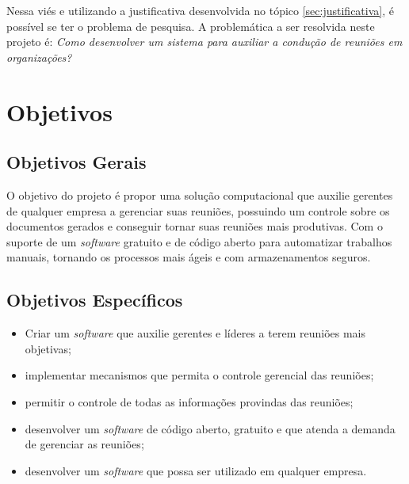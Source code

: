 Nessa viés e utilizando a justificativa desenvolvida no tópico \ref{sec:justificativa}, é possível se ter o problema de pesquisa. A problemática a ser resolvida neste projeto é: \textit{Como desenvolver um sistema para auxiliar a condução de reuniões em organizações?}

\section{Objetivos}
\label{sec:objetivos}

\subsection{Objetivos Gerais}
\label{sec:objetivos_gerais}

O objetivo do projeto é propor uma solução computacional que auxilie gerentes de qualquer empresa a gerenciar suas reuniões, possuindo um controle sobre os documentos gerados e conseguir tornar suas reuniões mais produtivas. Com o suporte de um \textit{software} gratuito e de código aberto para automatizar trabalhos manuais, tornando os processos mais ágeis e com armazenamentos seguros.

\subsection{Objetivos Específicos}
\label{sec:objetivos_especificos}

\begin{itemize}
    \item Criar um \textit{software} que auxilie gerentes e líderes a terem reuniões mais objetivas;
    \item implementar mecanismos que permita o controle gerencial das reuniões;
    \item permitir o controle de todas as informações provindas das reuniões;
    \item desenvolver um \textit{software} de código aberto, gratuito e que atenda a demanda de gerenciar as reuniões;
    \item desenvolver um \textit{software} que possa ser utilizado em qualquer empresa.
\end{itemize}